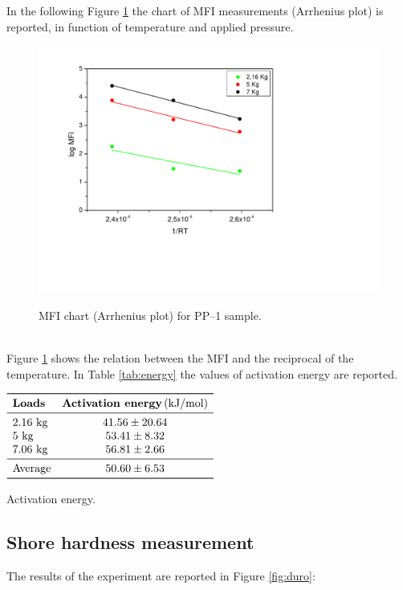 \documentclass[a4paper, 11pt]{article}
\begin{document}
In the following Figure \ref{fig:arrhenius} the chart of MFI measurements (Arrhenius plot) is reported, in function of temperature and applied pressure. 
\begin{figure}[h!]
	\centering
	{\includegraphics[scale=0.4]{arrhenius}}
	\captionsetup{justification=centering}
	\caption{MFI chart (Arrhenius plot) for PP–1 sample.}
	\label{fig:arrhenius}
\end{figure}\\
Figure \ref{fig:arrhenius} shows the relation between the MFI and the reciprocal of the temperature. In Table \ref{tab:energy} the values of activation energy are reported.
\begin{table}[htp]
\centering
$
\begin{array}{lc}
\toprule
\textbf{Loads} & \textbf{Activation energy} \, \text{(kJ/mol)}  \\
\midrule
\text{2.16 kg} & 41.56 \pm 20.64  \\
\text{5 kg} & 53.41 \pm 8.32 \\
\text{7.06 kg} & 56.81 \pm 2.66  \\
\midrule
\text{Average} & 50.60 \pm 6.53 \\
\bottomrule
\end{array}
$
\caption{Activation energy.}
\label{tab:energy}
\end{table}

\subsection{Shore hardness measurement}

The results of the experiment are reported in Figure \ref{fig:duro}:
\end{document}
